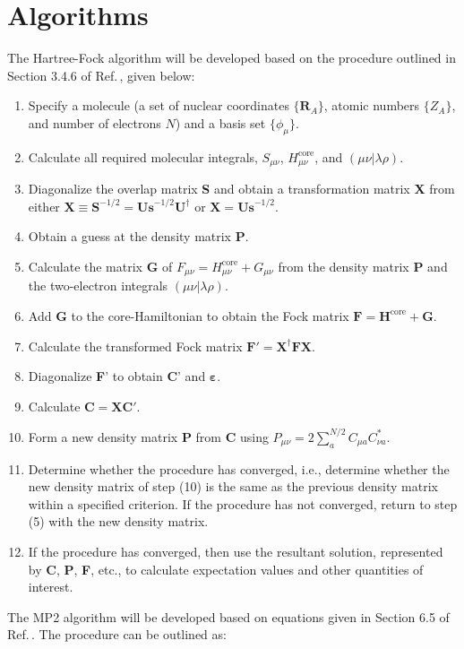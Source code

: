 \documentclass{article}
\newcommand{\mbf}[1]{\mathbf{#1}}
\newcommand{\tbf}[1]{\textbf{#1}}
\begin{document}
\section{Algorithms}
\quad The Hartree-Fock algorithm will be developed based on the procedure outlined in Section 3.4.6 of Ref.\,\cite{MQC}, given below: 
\begin{enumerate}
\item Specify a molecule (a set of nuclear coordinates $\{ \mathbf{R}_A\}$, atomic numbers $\{ Z_A\}$, and number of electrons $N$) and a basis set $\{\phi_{\mu}\}$. 
\item Calculate all required molecular integrals, $S_{\mu \nu}$, $H_{\mu\nu}^{\text{core}}$, and $(\mu\nu | \lambda\rho)$.
\item Diagonalize the overlap matrix \textbf{S} and obtain a transformation matrix \textbf{X} from either $\mathbf{X} \equiv \mathbf{S}^{-1/2} = \mathbf{Us}^{-1/2}\mathbf{U}^{\dagger}$ or $\mbf{X} = \mbf{Us}^{-1/2}$.
\item Obtain a guess at the density matrix \textbf{P}.
\item Calculate the matrix \textbf{G} of $F_{\mu\nu} = H_{\mu\nu}^{\text{core}} + G_{\mu\nu}$ from the density matrix \tbf{P} and the two-electron integrals $(\mu\nu | \lambda \rho)$.
\item Add \tbf{G} to the core-Hamiltonian to obtain the Fock matrix $\mbf{F} = \mbf{H}^{\text{core}} + \mbf{G}$.
\item Calculate the transformed Fock matrix $\mbf{F}' = \mbf{X}^{\dagger}\mbf{FX}$.
\item Diagonalize \tbf{F}' to obtain \tbf{C}' and $\boldsymbol{\varepsilon}$.
\item Calculate $\mbf{C} = \mbf{XC}'$.
\item Form a new density matrix \tbf{P} from \tbf{C} using $P_{\mu\nu} = 2\sum\limits_a^{N/2} C_{\mu a} C_{\nu a}^*$.
\item Determine whether the procedure has converged, i.e., determine whether the new density matrix of step (10) is the same as the previous density matrix within a specified criterion. If the procedure has not converged, return to step (5) with the new density matrix.
\item If the procedure has converged, then use the resultant solution, represented by \tbf{C}, \tbf{P}, \tbf{F}, etc., to calculate expectation values and other quantities of interest.
\end{enumerate}
\par \quad
\par \quad The MP2 algorithm will be developed based on equations given in Section 6.5 of Ref.\,\cite{MQC}. The procedure can be outlined as: 
\end{document}
